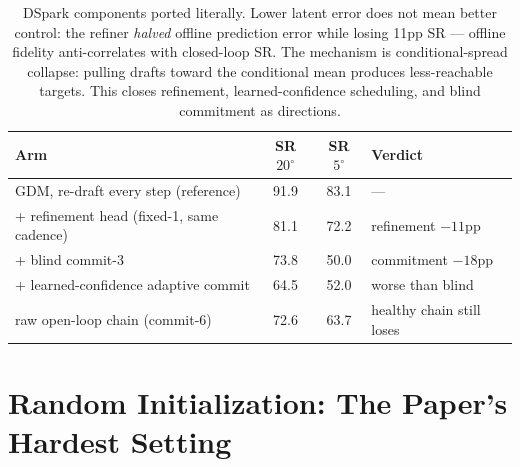 \documentclass{article}
\newcommand{\degc}[1]{$#1^\circ$}
\begin{document}
\begin{table}[h]
\centering
\caption{DSpark components ported literally. Lower latent error does not mean better
control: the refiner \emph{halved} offline prediction error while losing 11pp SR ---
offline fidelity anti-correlates with closed-loop SR. The mechanism is conditional-spread
collapse: pulling drafts toward the conditional mean produces less-reachable targets.
This closes refinement, learned-confidence scheduling, and blind commitment as directions.}
\label{tab:dspark-neg}
\begin{tabular}{lccl}
\toprule
Arm & SR \degc{20} & SR \degc{5} & Verdict \\
\midrule
GDM, re-draft every step (reference)          & 91.9 & 83.1 & --- \\
+ refinement head (fixed-1, same cadence)     & 81.1 & 72.2 & refinement $-11$pp \\
+ blind commit-3                              & 73.8 & 50.0 & commitment $-18$pp \\
+ learned-confidence adaptive commit          & 64.5 & 52.0 & worse than blind \\
raw open-loop chain (commit-6)                & 72.6 & 63.7 & healthy chain still loses \\
\bottomrule
\end{tabular}
\end{table}

\section{Random Initialization: The Paper's Hardest Setting}
\label{sec:randinit}
\end{document}
